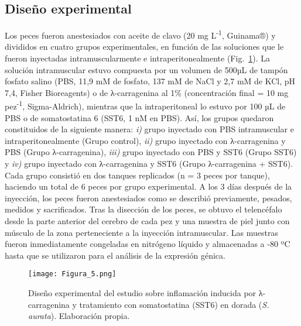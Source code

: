 \documentclass[10pt,a4paper]{article}
\begin{document}
\subsection{Diseño experimental}
Los peces fueron anestesiados con aceite de clavo (20 mg L\textsuperscript{-1}, Guinama®) y divididos en cuatro grupos experimentales, en función de las soluciones que le fueron inyectadas intramuscularmente e intraperitonealmente (Fig.~\ref{fig:5}). La solución intramuscular estuvo compuesta por un volumen de 500µL de tampón fosfato salino (PBS, 11,9 mM de fosfato, 137 mM de NaCl y 2,7 mM de KCl, pH 7,4, Fisher Bioreagents) o de λ-carragenina al 1\% (concentración final = 10 mg pez\textsuperscript{-1}, Sigma-Aldrich), mientras que la intraperitoneal lo estuvo por 100 µL de PBS o de somatostatina 6 (SST6, 1 nM en PBS). Así, los grupos quedaron constituidos de la siguiente manera: \textit{i)} grupo inyectado con PBS intramuscular e intraperitonealmente (Grupo control), \textit{ii)} grupo inyectado con λ-carragenina y PBS (Grupo λ-carragenina), \textit{iii)} grupo inyectado con PBS y SST6 (Grupo SST6) y \textit{iv)} grupo inyectado con λ-carragenina y SST6 (Grupo λ-carragenina + SST6). Cada grupo consistió en dos tanques replicados (n = 3 peces por tanque), haciendo un total de 6 peces por grupo experimental. A los 3 días después de la inyección, los peces fueron anestesiados como se describió previamente, pesados, medidos y sacrificados. Tras la disección de los peces, se obtuvo el telencéfalo desde la parte anterior del cerebro de cada pez y una muestra de piel junto con músculo de la zona perteneciente a la inyección intramuscular. Las muestras fueron inmediatamente congeladas en nitrógeno líquido y almacenadas a -80 ºC hasta que se utilizaron para el análisis de la expresión génica.

\begin{figure}[ht]
  \centering
 \texttt{[image: Figura\_5.png]}
 
  \caption{Diseño experimental del estudio sobre inflamación inducida por λ-carragenina y tratamiento con somatostatina (SST6) en dorada (\textit{S. aurata}). Elaboración propia.}
  \label{fig:5}
\end{figure}
\end{document}
